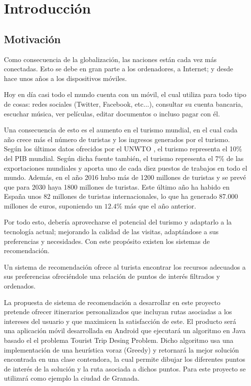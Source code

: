 \chapter{Introducción}

\section[Motivación]{Motivación}
Como consecuencia de la globalización, las naciones están cada vez más conectadas. Esto se debe en gran parte a los ordenadores, a Internet; y desde hace unos años a los dispositivos móviles.\newline

Hoy en día casi todo el mundo cuenta con un móvil, el cual utiliza para todo tipo de cosas: redes sociales (Twitter, Facebook, etc...), consultar su cuenta bancaria, escuchar música, ver películas, editar documentos o incluso pagar con él.\newline

Una consecuencia de esto es el aumento en el turismo mundial, en el cual cada año crece más el número de turistas y los ingresos generados por el turismo. Según los últimos datos ofrecidos por el UNWTO \cite{unwto_resumen}, el turismo representa el 10\% del PIB mundial. Según dicha fuente también, el turismo representa el 7\% de las exportaciones mundiales y aporta uno de cada diez puestos de trabajos en todo el mundo. Además, en el año 2016 hubo más de 1200 millones de turistas y se prevé que para 2030 haya 1800 millones de turistas. Este último año ha habido en España unos 82 millones de turistas internacionales, lo que ha generado 87.000 millones de euros, suponiendo un $12.4\%$ más que el año anterior.\newline

Por todo esto, debería aprovecharse el potencial del turismo y adaptarlo a la tecnología actual; mejorando la calidad de las visitas, adaptándose a sus preferencias y necesidades. Con este propósito existen los sistemas de recomendación.\newline

Un sistema de recomendación ofrece al turista encontrar los recursos adecuados a sus preferencias ofreciéndole una relación de puntos de interés filtrados y ordenados.\newline

La propuesta de sistema de recomendación a desarrollar en este proyecto pretende ofrecer itinerarios personalizados que incluyan rutas asociadas a los intereses del usuario y que maximicen la satisfacción de este. El producto será una aplicación móvil desarrollada en Android que ejecutará un algoritmo en Java basado el el problema Tourist Trip Desing Problem. Dicho algoritmo usa una implementación de una heurística voraz (Greedy) y retornará la mejor solución encontrada en una clase contendora, la cual permite dibujar los diferentes puntos de interés de la solución y la ruta asociada a dichos puntos. Para este proyecto se utilizará como ejemplo la ciudad de Granada.
